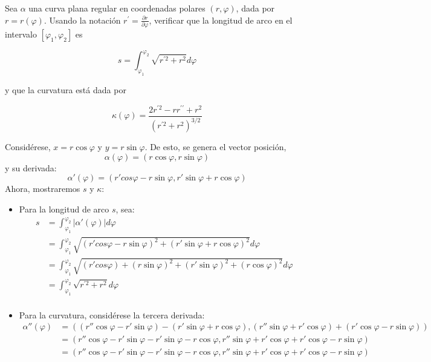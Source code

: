 \begin{problema}
    
    Sea $\alpha$ una curva plana regular en coordenadas polares $(r, \varphi)$, dada por $r=r(\varphi)$. Usando la notación $r^{\prime}=\frac{\partial r}{\partial \varphi}$, verificar que la longitud de arco en el intervalo $\left[\varphi_{1}, \varphi_{2}\right]$ es

$$
s=\int_{\varphi_{1}}^{\varphi_{2}} \sqrt{r^{\prime 2}+r^{2}} d \varphi
$$

y que la curvatura está dada por

$$
\kappa(\varphi)=\frac{2 r^{\prime 2}-r r^{\prime \prime}+r^{2}}{\left(r^{\prime 2}+r^{2}\right)^{3 / 2}}
$$

\begin{sol}
    Considérese, $x=r\cos \varphi$ y $y=r\sin\varphi $. De esto, se genera el vector posición, 
    $$\alpha(\varphi)= \left(r\cos \varphi,r\sin \varphi\right)$$
    y su derivada: 
    $$\alpha'(\varphi)= \left(r'cos\varphi - r\sin \varphi,r'\sin \varphi +r\cos\varphi \right)$$
    Ahora, mostraremos $s$ y $\kappa$: 
    \begin{itemize}
        \item Para la longitud de arco $s$, sea: 
        \begin{align*}
            s &= \int_{\varphi_1}^{\varphi_2}|\alpha'(\varphi)|d\varphi\\
              &= \int_{\varphi_1}^{\varphi_2}\sqrt{(r'cos\varphi - r\sin \varphi)^2+(r'\sin \varphi +r\cos\varphi)^2}d\varphi\\
              &= \int_{\varphi_1}^{\varphi_2}\sqrt{(r'cos\varphi)+ (r\sin \varphi)^2+(r'\sin \varphi)^2 +(r\cos\varphi)^2}d\varphi\\
              &= \int_{\varphi_1}^{\varphi_2}\sqrt{r^{\prime 2}+r^{2}}d\varphi\\
        \end{align*}
        \item Para la curvatura, considérese la tercera derivada:\
        \begin{align*}
            \alpha''(\varphi) &= \left((r''\cos\varphi -r'\sin\varphi)-(r'\sin \varphi +r\cos\varphi), (r''\sin \varphi + r'\cos \varphi)+(r'\cos\varphi -r\sin\varphi )\right)\\
            &= \left(r''\cos\varphi -r'\sin\varphi-r'\sin \varphi -r\cos\varphi, r''\sin \varphi + r'\cos \varphi+r'\cos\varphi -r\sin\varphi \right)\\
            &= \left(r''\cos\varphi -r'\sin\varphi-r'\sin \varphi -r\cos\varphi, r''\sin \varphi + r'\cos \varphi+r'\cos\varphi -r\sin\varphi \right)\\

\end{align*}
\end{itemize}
\end{sol}
\end{problema}

